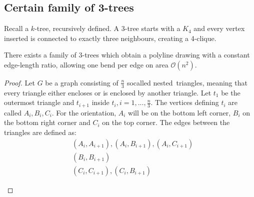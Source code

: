 \subsection{Certain family of 3-trees}\label{section:3-tree-family}
Recall a $k$-tree, recursively defined. A 3-tree starts with a $K_4$ and every vertex inserted is connected to exactly three neighbours, creating a 4-clique.
\begin{theorem}
	There exists a family of 3-trees which obtain a polyline drawing with a constant edge-length ratio, allowing one bend per edge on area $\mathcal{O}(n^2)$.
\end{theorem}
\begin{proof}
	Let $G$ be a graph consisting of $\frac{n}{3}$ socalled \grqq nested\grqq~triangles, meaning that every triangle either encloses or is enclosed by another triangle.  Let $t_1$ be the outermost triangle and $t_{i+1}$ inside $t_i,i=1,...,\frac{n}{3}$. The vertices defining $t_i$ are called $A_i,B_i,C_i$. For the orientation, $A_i$ will be on the bottom left corner, $B_i$ on the bottom right corner and $C_i$ on the top corner. The edges between the triangles are defined as:
	\begin{align}
		&(A_i,A_{i+1}),(A_i,B_{i+1}),(A_i,C_{i+1})\\
		&(B_i,B_{i+1})\\
		&(C_i,C_{i+1}),(C_i,B_{i+1})
	\end{align}
		\begin{figure}[H]
	\centering
	\begin{subfigure}{0.8\linewidth}
		\centering

\end{subfigure}
\end{figure}
\end{proof}
